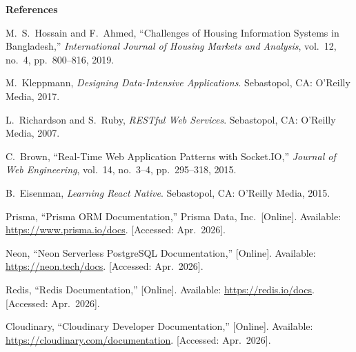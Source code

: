 \documentclass[12pt,a4paper]{report}
\begin{document}
\clearpage
{}
{}

{\centering\fontsize{14}{21}\bfseries References\par}
\vspace{24pt}

\begin{enumerate}[
  label={[\arabic*]},
  leftmargin=0pt,
  labelwidth=2em,
  labelsep=0.3em,
  itemindent=2.31em,
  itemsep=0pt,
  parsep=6pt]

  \item M.~S.\ Hossain and F.~Ahmed, ``Challenges of Housing Information Systems in
        Bangladesh,'' \textit{International Journal of Housing Markets and Analysis},
        vol.~12, no.~4, pp.~800--816, 2019.

  \item M.~Kleppmann, \textit{Designing Data-Intensive Applications}. Sebastopol, CA:
        O'Reilly Media, 2017.

  \item L.~Richardson and S.~Ruby, \textit{RESTful Web Services}. Sebastopol, CA:
        O'Reilly Media, 2007.

  \item C.~Brown, ``Real-Time Web Application Patterns with Socket.IO,''
        \textit{Journal of Web Engineering}, vol.~14, no.~3--4, pp.~295--318, 2015.

  \item B.~Eisenman, \textit{Learning React Native}. Sebastopol, CA: O'Reilly Media,
        2015.

  \item Prisma, ``Prisma ORM Documentation,'' Prisma Data, Inc.\ [Online]. Available:
        \url{https://www.prisma.io/docs}. [Accessed: Apr.\ 2026].

  \item Neon, ``Neon Serverless PostgreSQL Documentation,'' [Online]. Available:
        \url{https://neon.tech/docs}. [Accessed: Apr.\ 2026].

  \item Redis, ``Redis Documentation,'' [Online]. Available:
        \url{https://redis.io/docs}. [Accessed: Apr.\ 2026].

  \item Cloudinary, ``Cloudinary Developer Documentation,'' [Online]. Available:
        \url{https://cloudinary.com/documentation}. [Accessed: Apr.\ 2026].


\end{enumerate}
\end{document}
